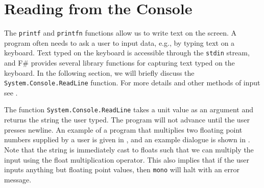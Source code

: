 \section{Reading from the Console}
\label{sec:readline}
The \lstinline{printf} and \lstinline{printfn} functions allow us to write text on the screen. A program often needs to ask a user to input data, e.g., by typing text on a keyboard. Text typed on the keyboard is accessible through the \lstinline{stdin} stream, and F\# provides several library functions for capturing text typed on the keyboard. In the following section, we will briefly discuss the \lstinline{System.Console.ReadLine} function. For more details and other methods of input see .

The function \lstinline{System.Console.ReadLine} takes a unit value as an argument and returns the string the user typed. The program will not advance until the user presses newline. An example of a program that multiplies two floating point numbers supplied by a user is given in ,
%
%
and an example dialogue is shown in .
%
%
%
%
%
Note that the string is immediately cast to floats such that we can multiply the input using the float multiplication operator. This also implies that if the user inputs anything but floating point values, then \lstinline[language=console]{mono} will halt with an error message.

